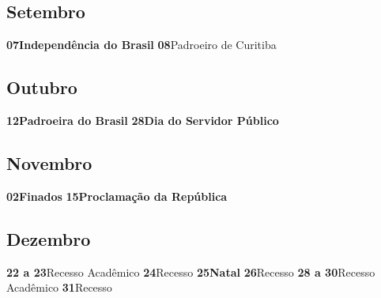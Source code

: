 \documentclass[thesis]{hmcposter}
\begin{document}
\begin{poster}
\subsection{Setembro}\textbf{07}\quad \quad \quad \quad \textbf{Independência do Brasil} \newline\textbf{08}\quad \quad \quad \quad Padroeiro de Curitiba \subsection{Outubro}\textbf{12}\quad \quad \quad \quad \textbf{Padroeira do Brasil} \newline\textbf{28}\quad \quad \quad \quad \textbf{Dia do Servidor Público} \subsection{Novembro}\textbf{02}\quad \quad \quad \quad \textbf{Finados} \newline\textbf{15}\quad \quad \quad \quad \textbf{Proclamação da República} \subsection{Dezembro}\textbf{22 a 23}\quad \quad Recesso Acadêmico \newline\textbf{24}\quad \quad \quad \quad Recesso \newline\textbf{25}\quad \quad \quad \quad \textbf{Natal} \newline\textbf{26}\quad \quad \quad \quad Recesso \newline\textbf{28 a 30}\quad \quad Recesso Acadêmico \newline\textbf{31}\quad \quad \quad \quad Recesso \newline\newpage

\end{poster}
\end{document}

